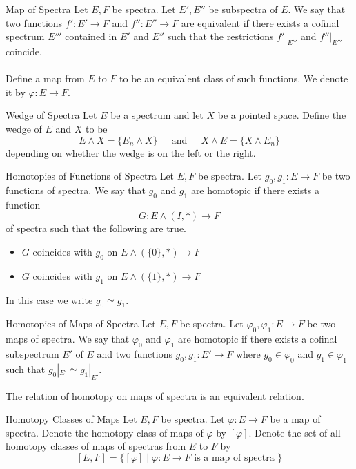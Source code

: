 \documentclass[a4paper]{article}
\begin{document}
\begin{defn}{Map of Spectra}{} Let $E,F$ be spectra. Let $E',E''$ be subspectra of $E$. We say that two functions $f':E'\to F$ and $f'':E''\to F$ are equivalent if there exists a cofinal spectrum $E'''$ contained in $E'$ and $E''$ such that the restrictions $f'|_{E'''}$ and $f''|_{E'''}$ coincide. \\~\\

Define a map from $E$ to $F$ to be an equivalent class of such functions. We denote it by $\varphi:E\to F$. 
\end{defn}

\begin{defn}{Wedge of Spectra}{} Let $E$ be a spectrum and let $X$ be a pointed space. Define the wedge of $E$ and $X$ to be $$E\wedge X=\{E_n\wedge X\}\;\;\;\;\text{ and }\;\;\;\;X\wedge E=\{X\wedge E_n\}$$ depending on whether the wedge is on the left or the right. 
\end{defn}

\begin{defn}{Homotopies of Functions of Spectra}{} Let $E,F$ be spectra. Let $g_0,g_1:E\to F$ be two functions of spectra. We say that $g_0$ and $g_1$ are homotopic if there exists a function $$G:E\wedge(I,\ast)\to F$$ of spectra such that the following are true. 
\begin{itemize}
\item $G$ coincides with $g_0$ on $E\wedge(\{0\},\ast)\to F$
\item $G$ coincides with $g_1$ on $E\wedge(\{1\},\ast)\to F$
\end{itemize}
In this case we write $g_0\simeq g_1$. 
\end{defn}

\begin{defn}{Homotopies of Maps of Spectra}{} Let $E,F$ be spectra. Let $\varphi_0,\varphi_1:E\to F$ be two maps of spectra. We say that $\varphi_0$ and $\varphi_1$ are homotopic if there exists a cofinal subspectrum $E'$ of $E$ and two functions $g_0,g_1:E'\to F$ where $g_0\in\varphi_0$ and $g_1\in\varphi_1$ such that $g_0|_{E'}\simeq g_1|_{E'}$. 
\end{defn}

\begin{lmm}{}{} The relation of homotopy on maps of spectra is an equivalent relation. 
\end{lmm}

\begin{defn}{Homotopy Classes of Maps}{} Let $E,F$ be spectra. Let $\varphi:E\to F$ be a map of spectra. Denote the homotopy class of maps of $\varphi$ by $[\varphi]$. Denote the set of all homotopy classes of maps of spectras from $E$ to $F$ by $$[E,F]=\{[\varphi]\;|\;\varphi:E\to F\text{ is a map of spectra }\}$$
\end{defn}
\end{document}
